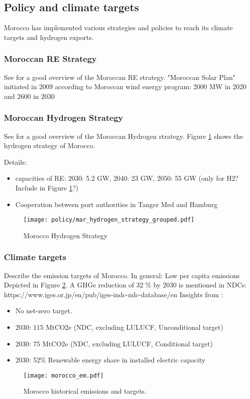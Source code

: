 \subsection{Policy and climate targets}
Morocco has implemented various strategies and policies to reach its climate targets and hydrogen exports. 

\subsubsection{Moroccan RE Strategy}
See \cite[p. 13]{Ersoy2022} for a good overview of the Moroccan RE strategy.
"Moroccan Solar Plan" initiated in 2009 according to \cite[p. 2]{Boulakhbar2020}
Moroccan wind energy program: 2000 MW in 2020 and 2600 in 2030 \cite[p. 4]{Boulakhbar2020}

\subsubsection{Moroccan Hydrogen Strategy}
See \cite[p. 14]{Ersoy2022} for a good overview of the Moroccan Hydrogen strategy. Figure \ref{fig:mar_hydrogen_strategy} shows the hydrogen strategy of Morocco.

Details:
\begin{itemize}
    \item capacities of RE: 2030: 5.2 GW, 2040: 23 GW, 2050: 55 GW (only for H2? Include in Figure \ref{fig:mar_hydrogen_strategy}?)
    \item Cooperation between port authorities in Tanger Med and Hamburg
\end{itemize}

\begin{figure}
    \centering
    \texttt{[image: policy/mar\_hydrogen\_strategy\_grouped.pdf]}
    \caption{Morocco Hydrogen Strategy}
    \label{fig:mar_hydrogen_strategy}
\end{figure}

\subsubsection{Climate targets}
Describe the emission targets of Morocco. In general: Low per capita emissions
Depicted in Figure \ref{fig:morocco_em}.
A GHGe reduction of 32 \% by 2030 is mentioned in \cite[5]{Boulakhbar2020}
NDCs: https://www.iges.or.jp/en/pub/iges-indc-ndc-database/en 
Insights from \cite{CAT2021}:
\begin{itemize}
    \item No net-zero target.
    \item 2030: 115 MtCO2e (NDC, excluding LULUCF, Unconditional target)
    \item 2030: 75 MtCO2e (NDC, excluding LULUCF, Conditional target)
    \item 2030: 52\% Renewable energy share in installed electric capacity
\end{itemize}

\begin{figure}[h!]
    \centering
    \texttt{[image: morocco\_em.pdf]}
    \caption{Morocco historical emissions and targets.}
    \label{fig:morocco_em}
\end{figure}